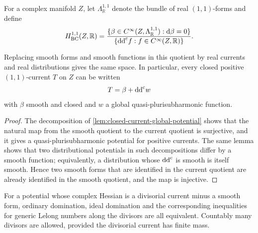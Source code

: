 For a complex manifold $Z$, let $\Lambda^{1,1}_{\mathbb R}$ denote the bundle of real $(1,1)$-forms and define
\[
 H^{1,1}_{\mathrm{BC}}(Z,\mathbb R)
 =\frac{\{\beta\in C^\infty(Z,\Lambda^{1,1}_{\mathbb R}):\mathrm{d}\beta=0\}}
        {\{\mathrm{dd}^{\mathrm{c}} f:f\in C^\infty(Z,\mathbb R)\}}.
\]
\begin{lemma}\label{lem:bc-one-one-current-description}
Replacing smooth forms and smooth functions in this quotient by real currents and real distributions gives the same space. In particular, every closed positive $(1,1)$-current $T$ on $Z$ can be written
\[
 T=\beta+\mathrm{dd}^{\mathrm{c}} w
\]
with $\beta$ smooth and closed and $w$ a global quasi-plurisubharmonic function.
\end{lemma}
\begin{proof}
The decomposition of \cref{lem:closed-current-global-potential} shows that the natural map from the smooth quotient to the current quotient is surjective, and it gives a quasi-plurisubharmonic potential for positive currents. The same lemma shows that two distributional potentials in such decompositions differ by a smooth function; equivalently, a distribution whose $\mathrm{dd}^{\mathrm{c}}$ is smooth is itself smooth. Hence two smooth forms that are identified in the current quotient are already identified in the smooth quotient, and the map is injective.
\end{proof}

For a potential whose complex Hessian is a divisorial current minus a smooth form, ordinary domination, ideal domination and the corresponding inequalities for generic Lelong numbers along the divisors are all equivalent. Countably many divisors are allowed, provided the divisorial current has finite mass.

